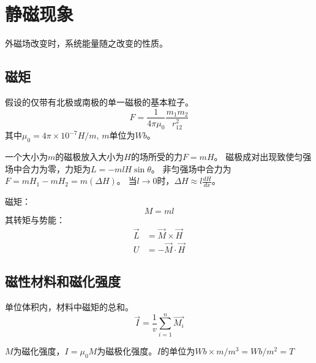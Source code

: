 \chapter{静磁现象}



\begin{definition}[磁性]
    外磁场改变时，系统能量随之改变的性质。
\end{definition}


\section{磁矩}
\begin{definition}[磁荷]
    假设的仅带有北极或南极的单一磁极的基本粒子。
    \[ F = \frac{1}{4\pi\mu_0} \frac{m_1m_2}{r^2_{12}} \]
    其中$\mu_0=4\pi \times 10^{-7} H/m$, $m$单位为$Wb$。
\end{definition}

\begin{proposition}[磁力矩]
    一个大小为$m$的磁极放入大小为$H$的场所受的力$F=mH$。
    磁极成对出现致使匀强场中合力为零，力矩为$L=-mlH\sin{\theta}$。
    非匀强场中合力为$F=mH_1-mH_2=m(\Delta H)$。
    当$l\to0$时，$\Delta H \approx l\frac{dH}{dx}$。
\end{proposition}

\begin{definition}[磁矩]
    磁矩：
    \[M=ml\]
    其转矩与势能：
    \begin{align*}
        \vec{L} &= \vec{M} \times \vec{H} \\
        U &= -\vec{M} \cdot \vec{H}
    \end{align*}
\end{definition}



\section{磁性材料和磁化强度}

\begin{definition}[磁化强度]
    单位体积内，材料中磁矩的总和。
    \[\vec{I}=\frac{1}{v}\sum^{n}_{i=1}\vec{M_i}\]
\end{definition}
\begin{remark}
    $M$为磁化强度，$I=\mu_0M$为磁极化强度。$I$的单位为$Wb\times m/m^3=Wb/m^2=T$
\end{remark}


